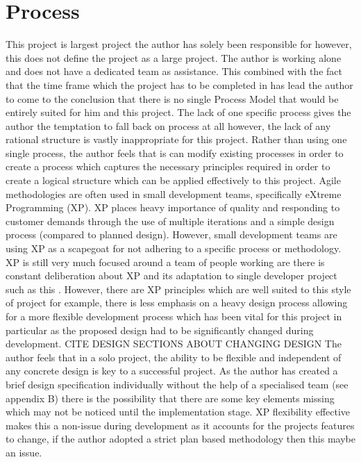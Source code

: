 
\chapter{Process}

This project is largest project the author has solely been responsible for however, this does not define the project as a large project. The author is working alone and does not have a dedicated team as assistance. This combined with the fact that the time frame which the project has to be completed in has lead the author to come to the conclusion that there is no single Process Model that would be entirely suited for him and this project. The lack of one specific process gives the author the temptation to fall back on process at all however, the lack of any rational structure is vastly inappropriate for this project.
Rather than using one single process, the author feels that is can modify existing processes in order to create a process which captures the necessary principles required in order to create a logical structure which can be applied effectively to this project. Agile methodologies are often used in small development teams, specifically eXtreme Programming (XP). XP places heavy importance of quality and responding to customer demands through the use of multiple iterations and a simple design process (compared to planned design). However, small development teams are using XP as a scapegoat for not adhering to a specific process or methodology. XP is still very much focused around a team of people working are there is constant deliberation about XP and its adaptation to single developer project such as this \cite{XP:forone}. However, there are XP principles which are well suited to this style of project for example, there is less emphasis on a heavy design process allowing for a more flexible development process which has been vital for this project in particular as the proposed design had to be significantly changed during development. \Large CITE DESIGN SECTIONS ABOUT CHANGING DESIGN \normalsize The author feels that in a solo project, the ability to be flexible and independent of any concrete design is key to a successful project. As the author has created a brief design specification individually without the help of a specialised team (see appendix B) there is the possibility that there are some key elements missing which may not be noticed until the implementation stage. XP flexibility effective makes this a non-issue during development as it accounts for the projects features to change, if the author adopted a strict plan based methodology then this maybe an issue.

